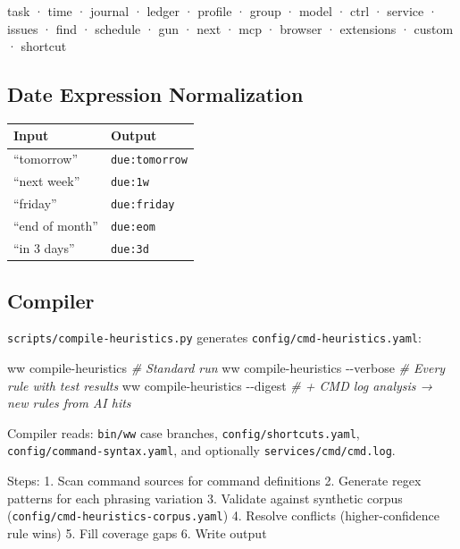 \documentclass[
]{article}
\newenvironment{Shaded}{\begin{snugshade}}{\end{snugshade}}
\newcommand{\AttributeTok}[1]{\textcolor[rgb]{0.13,0.29,0.53}{#1}}
\newcommand{\CommentTok}[1]{\textcolor[rgb]{0.56,0.35,0.01}{\textit{#1}}}
\newcommand{\ExtensionTok}[1]{#1}
\newcommand{\NormalTok}[1]{#1}
\newcounter{none} %
\begin{document}
task · time · journal · ledger · profile · group · model · ctrl ·
service · issues · find · schedule · gun · next · mcp · browser ·
extensions · custom · shortcut

\subsection{Date Expression
Normalization}\label{date-expression-normalization}

{\def\LTcaptype{none} %
\begin{longtable}[]{@{}ll@{}}
\toprule\noalign{}
Input & Output \\
\midrule\noalign{}
\endhead
\bottomrule\noalign{}
\endlastfoot
``tomorrow'' & \texttt{due:tomorrow} \\
``next week'' & \texttt{due:1w} \\
``friday'' & \texttt{due:friday} \\
``end of month'' & \texttt{due:eom} \\
``in 3 days'' & \texttt{due:3d} \\
\end{longtable}
}

\subsection{Compiler}\label{compiler}

\texttt{scripts/compile-heuristics.py} generates
\texttt{config/cmd-heuristics.yaml}:

\begin{Shaded}
\begin{Highlighting}[]
\ExtensionTok{ww}\NormalTok{ compile{-}heuristics              }\CommentTok{\# Standard run}
\ExtensionTok{ww}\NormalTok{ compile{-}heuristics }\AttributeTok{{-}{-}verbose}    \CommentTok{\# Every rule with test results}
\ExtensionTok{ww}\NormalTok{ compile{-}heuristics }\AttributeTok{{-}{-}digest}     \CommentTok{\# + CMD log analysis → new rules from AI hits}
\end{Highlighting}
\end{Shaded}

Compiler reads: \texttt{bin/ww} case branches,
\texttt{config/shortcuts.yaml}, \texttt{config/command-syntax.yaml}, and
optionally \texttt{services/cmd/cmd.log}.

Steps: 1. Scan command sources for command definitions 2. Generate regex
patterns for each phrasing variation 3. Validate against synthetic
corpus (\texttt{config/cmd-heuristics-corpus.yaml}) 4. Resolve conflicts
(higher-confidence rule wins) 5. Fill coverage gaps 6. Write output
\end{document}

